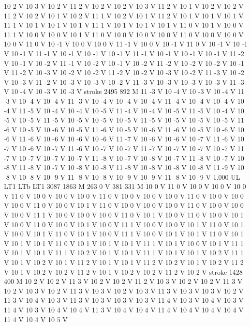 {{10 2 V
10 3 V
10 2 V
11 2 V
10 2 V
10 2 V
10 3 V
11 2 V
10 1 V
10 2 V
10 2 V
11 2 V
10 2 V
10 1 V
10 2 V
11 1 V
10 2 V
10 1 V
11 2 V
10 1 V
10 1 V
10 1 V
11 1 V
10 1 V
10 1 V
10 1 V
11 1 V
10 1 V
10 1 V
10 1 V
11 0 V
10 1 V
10 0 V
11 1 V
10 0 V
10 0 V
10 1 V
11 0 V
10 0 V
10 0 V
10 0 V
11 0 V
10 0 V
10 0 V
10 0 V
11 0 V
10 -1 V
10 0 V
10 0 V
11 -1 V
10 0 V
10 -1 V
11 0 V
10 -1 V
10 -1 V
10 -1 V
11 -1 V
10 -1 V
10 -1 V
10 -1 V
11 -1 V
10 -1 V
10 -1 V
10 -1 V
11 -2 V
10 -1 V
10 -2 V
11 -1 V
10 -2 V
10 -1 V
10 -2 V
11 -2 V
10 -2 V
10 -2 V
10 -1 V
11 -2 V
10 -3 V
10 -2 V
10 -2 V
11 -2 V
10 -2 V
10 -3 V
10 -2 V
11 -3 V
10 -2 V
10 -3 V
11 -2 V
10 -3 V
10 -3 V
10 -2 V
11 -3 V
10 -3 V
10 -3 V
10 -3 V
11 -3 V
10 -4 V
10 -3 V
10 -3 V
stroke
2495 892 M
11 -3 V
10 -4 V
10 -3 V
10 -4 V
11 -3 V
10 -4 V
10 -4 V
11 -3 V
10 -4 V
10 -4 V
10 -4 V
11 -4 V
10 -4 V
10 -4 V
10 -4 V
11 -5 V
10 -4 V
10 -4 V
10 -5 V
11 -4 V
10 -4 V
10 -5 V
11 -5 V
10 -4 V
10 -5 V
10 -5 V
11 -5 V
10 -5 V
10 -5 V
10 -5 V
11 -5 V
10 -5 V
10 -5 V
10 -5 V
11 -6 V
10 -5 V
10 -6 V
10 -5 V
11 -6 V
10 -5 V
10 -6 V
11 -6 V
10 -5 V
10 -6 V
10 -6 V
11 -6 V
10 -6 V
10 -6 V
10 -6 V
11 -7 V
10 -6 V
10 -6 V
10 -7 V
11 -6 V
10 -7 V
10 -6 V
10 -7 V
11 -6 V
10 -7 V
10 -7 V
11 -7 V
10 -7 V
10 -7 V
10 -7 V
11 -7 V
10 -7 V
10 -7 V
10 -7 V
11 -8 V
10 -7 V
10 -8 V
10 -7 V
11 -8 V
10 -7 V
10 -8 V
11 -8 V
10 -7 V
10 -8 V
10 -8 V
11 -8 V
10 -8 V
10 -8 V
10 -8 V
11 -9 V
10 -8 V
10 -8 V
10 -9 V
11 -8 V
10 -8 V
10 -9 V
10 -9 V
11 -8 V
10 -9 V
1.000 UL
LT1
LTb
LT1
3087 1863 M
263 0 V
381 331 M
10 0 V
11 0 V
10 0 V
10 0 V
10 0 V
11 0 V
10 0 V
10 0 V
10 0 V
11 0 V
10 0 V
10 0 V
10 0 V
11 0 V
10 0 V
10 0 V
10 0 V
11 0 V
10 0 V
10 1 V
11 0 V
10 0 V
10 0 V
10 0 V
11 0 V
10 0 V
10 0 V
10 0 V
11 1 V
10 0 V
10 0 V
10 0 V
11 0 V
10 1 V
10 0 V
11 0 V
10 0 V
10 1 V
10 0 V
11 0 V
10 0 V
10 1 V
10 0 V
11 1 V
10 0 V
10 0 V
10 1 V
11 0 V
10 1 V
10 0 V
10 1 V
11 0 V
10 1 V
10 0 V
11 1 V
10 0 V
10 1 V
10 1 V
11 0 V
10 1 V
10 1 V
10 1 V
11 0 V
10 1 V
10 1 V
10 1 V
11 1 V
10 1 V
10 0 V
10 1 V
11 1 V
10 1 V
10 1 V
11 1 V
10 2 V
10 1 V
10 1 V
11 1 V
10 1 V
10 1 V
10 2 V
11 1 V
10 1 V
10 2 V
10 1 V
11 2 V
10 1 V
10 1 V
11 2 V
10 2 V
10 1 V
10 2 V
11 2 V
10 1 V
10 2 V
10 2 V
11 2 V
10 1 V
10 2 V
10 2 V
11 2 V
10 2 V
stroke
1428 400 M
10 2 V
10 2 V
11 3 V
10 2 V
10 2 V
11 2 V
10 3 V
10 2 V
10 2 V
11 3 V
10 2 V
10 3 V
10 2 V
11 3 V
10 3 V
10 2 V
10 3 V
11 3 V
10 3 V
10 3 V
10 2 V
11 3 V
10 4 V
10 3 V
11 3 V
10 3 V
10 3 V
10 3 V
11 4 V
10 3 V
10 4 V
10 3 V
11 4 V
10 3 V
10 4 V
10 4 V
11 3 V
10 4 V
10 4 V
11 4 V
10 4 V
10 4 V
10 4 V
11 4 V
10 4 V
10 5 V
}}
